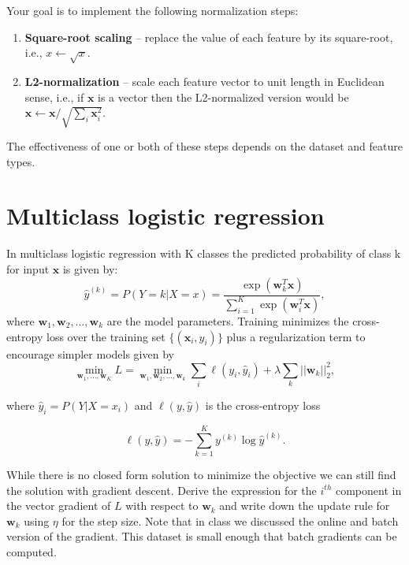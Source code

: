 \documentclass[10pt,letterpaper]{article}
\begin{document}
Your goal is to implement the following normalization steps:

\begin{enumerate}
\item \textbf{Square-root scaling} -- replace the value of each feature by its square-root, i.e., $x \leftarrow \sqrt{x}$.

\item \textbf{L2-normalization} -- scale each feature vector to unit length in Euclidean sense, i.e., if $\mathbf{x}$ is a vector then the L2-normalized version would be $\mathbf{x} \leftarrow \mathbf{x}/\sqrt{\sum_i \mathbf{x}_i^2}$.
\end{enumerate}

The effectiveness of one or both of these steps depends on the dataset and feature types.

\section{Multiclass logistic regression}
In multiclass logistic regression with K classes the predicted probability of class k for input $\mathbf{x}$ is given by:
\begin{equation}
\hat{y}^{(k)} = P(Y = k|X = x) = \frac{\exp(\mathbf{w}_k^T\mathbf{x})}{\sum_{i=1}^K \exp(\mathbf{w}_i^T\mathbf{x})}, 
\end{equation}
where ${\mathbf{w}_1, \mathbf{w}_2, \ldots, \mathbf{w}_k}$ are the model parameters.
Training minimizes the cross-entropy loss over the training set $\{(\mathbf{x}_i, y_i)\}$ plus a regularization term to encourage simpler models given by
\begin{equation}
\min_{\mathbf{w}_1, ..., \mathbf{w}_K} L = \min_{\mathbf{w}_1, \mathbf{w}_2, \ldots, \mathbf{w}_k} \sum_i \ell (y_i, \hat{y}_i) + \lambda \sum_k ||\mathbf{w}_k||^2_2, 
\end{equation}

where $\hat{y}_i = P(Y|X=x_i)$ and $\ell(y, \hat{y})$ is the cross-entropy loss

\begin{equation}
\ell (y, \hat{y}) = -\sum_{k=1}^{K} y^{(k)} \log \hat{y}^{(k)}.
\end{equation}

While there is no closed form solution to minimize the objective we
can still find the solution with gradient descent. Derive the
expression for the $i^{th}$
component in the vector gradient of $L$ with respect to $\mathbf{w}_k$
and write down the update rule for $\mathbf{w}_k$ using $\eta$ for the
step size. 
Note that in class we discussed the online and batch
version of the gradient. This dataset is small enough that batch
gradients can be computed.
\end{document}
